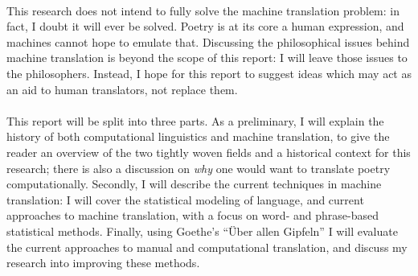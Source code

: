\paragraph{}{This research does not intend to fully solve the machine
  translation problem: in fact, I doubt it will ever be solved. Poetry
  is at its core a human expression, and machines cannot hope to
  emulate that. Discussing the philosophical issues behind machine
  translation is beyond the scope of this report: I will leave those
  issues to the philosophers. Instead, I hope for this report to
  suggest ideas which may act as an aid to human translators, not
  replace them. }

\paragraph{}{This report will be split into three parts. As a
  preliminary, I will explain the history of both computational
  linguistics and machine translation, to give the reader an overview
  of the two tightly woven fields and a historical context for this
  research; there is also a discussion on {\it why} one would want to
  translate poetry computationally. Secondly, I will describe the
  current techniques in machine translation: I will cover the
  statistical modeling of language, and current approaches to machine
  translation, with a focus on word- and phrase-based statistical
  methods. Finally, using Goethe's ``{\"U}ber allen Gipfeln'' I will
  evaluate the current approaches to manual and computational
  translation, and discuss my research into improving these methods. }

